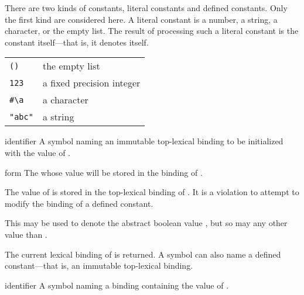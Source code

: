 \begin{optDefinition}
\noindent
%
\noindent
There are two kinds of constants, literal
constants and defined constants.  Only the
first kind are considered here.  A literal constant is a number, a string, a
character, or the empty list.  The result of processing such a literal constant
is the constant itself---that is, it denotes
itself.
%
\examples
\begin{tabular}{ll}
    \verb+()+ & the empty list\\
    \verb+123+ & a fixed precision integer\\
    \verb+#\a+ & a character\\
    \verb+"abc"+ & a string
\end{tabular}

%
\Syntax
{}%
%
\begin{arguments}
    \item[identifier] A symbol naming an immutable top-lexical binding to be
    initialized with the value of .

    \item[form] The  whose value will be stored in the binding of
    .
\end{arguments}
%
\remarks%
The value of  is stored in the top-lexical binding of
.  It is a violation to attempt to modify the binding of a
defined constant.

%
\remarks%
This may be used to denote the abstract boolean value , but so may any
other value than \nil{}.

\noindent
The current lexical binding of  is
returned.  A symbol can also name a defined
constant---that is, an immutable top-lexical binding.

%
\Syntax
{}%
%
\begin{arguments}
    \item[identifier] A symbol naming a binding containing the value of
    .


\end{arguments}
\end{optDefinition}
